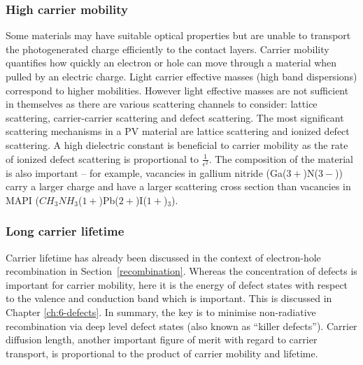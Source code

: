 \subsubsection{High carrier mobility}
Some materials may have suitable optical properties but are unable to transport the photogenerated charge efficiently to the contact layers. Carrier mobility quantifies how quickly an electron or hole can move through a material when pulled by an electric charge. 
Light carrier effective masses (high band dispersions) correspond to higher mobilities. However light effective masses are not sufficient in themselves as there are various scattering channels to consider: lattice scattering, carrier-carrier scattering and defect scattering. The most significant scattering mechanisms in a PV material are lattice scattering and ionized defect scattering.
A high dielectric constant is beneficial to carrier mobility as the rate of ionized defect scattering is proportional to $\frac{1}{\epsilon^2}$. The composition of the material is also important -- for example, vacancies in gallium nitride (Ga($3+$)N($3-$)) carry a larger charge and have a larger scattering cross section than vacancies in MAPI ($CH_3NH_3$($1+$)Pb($2+$)I($1+$)$_3$).

\subsubsection{Long carrier lifetime}
Carrier lifetime has already been discussed in the context of electron-hole recombination in Section\ \ref{recombination}. Whereas the concentration of defects is important for carrier mobility, here it is the energy of defect states with respect to the valence and conduction band which is important. This is discussed in Chapter \ref{ch:6-defects}. In summary, the key is to minimise non-radiative recombination via deep level defect states (also known as ``killer defects''). Carrier diffusion length, another important figure of merit with regard to carrier transport, is proportional to the product of carrier mobility and lifetime.

